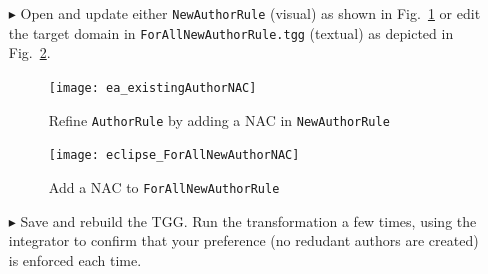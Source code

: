 \begin{itemize}

\item[$\blacktriangleright$] Open and update either \texttt{NewAuthorRule} (visual) as shown in Fig.~\ref{ea:existingAuthorNAC} or edit the target domain in 
\texttt{ForAllNewAuthorRule.tgg} (textual) as depicted in Fig.~\ref{eclipse:existingAuthorNAC}.


\begin{figure}[htbp]
\begin{center}
  \texttt{[image: ea\_existingAuthorNAC]}
  \caption{Refine \texttt{AuthorRule} by adding a NAC in \texttt{NewAuthorRule} \update}
  \label{ea:existingAuthorNAC}
\end{center}
\end{figure}

\begin{figure}[htbp]
\begin{center}
  \texttt{[image: eclipse\_ForAllNewAuthorNAC]}
  \caption{Add a NAC to \texttt{ForAllNewAuthorRule}}
  \label{eclipse:existingAuthorNAC}
\end{center}
\end{figure}

\item[$\blacktriangleright$] Save and rebuild the TGG. Run the transformation a few times, using the integrator to confirm that your preference (no redudant
authors are created) is enforced each time. 

\end{itemize}
